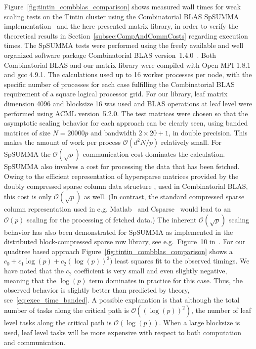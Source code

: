 \documentclass{elsarticle}
\begin{document}
Figure~\ref{fig:tintin_combblas_comparison} shows measured wall times
for weak scaling tests on the Tintin cluster using the Combinatorial
BLAS SpSUMMA implementation~\cite{CombBLAS} and the here presented
matrix library, in order to verify the theoretical results in
Section~\ref{subsec:CompAndCommCosts} regarding execution times.  The
SpSUMMA tests were performed using the freely available and well
organized software package Combinatorial BLAS
version~1.4.0~\cite{CombBLAS}.  Both Combinatorial BLAS and our matrix
library were compiled with Open MPI 1.8.1 and gcc 4.9.1.
The calculations used up to 16 worker processes per node, with the
specific number of processes for each case fulfilling the
Combinatorial BLAS requirement of a square logical processor grid. For
our library, leaf matrix dimension 4096 and blocksize 16 was used and
BLAS operations at leaf level were performed using ACML version~5.2.0.
The test matrices were chosen so that the asymptotic scaling behavior
for each approach can be clearly seen, using banded matrices of size
$N = 20000p$ and bandwidth $2\times 20+1$, in double precision.
This makes the amount of work per process
$\mathcal{O}(d^2N/p)$ relatively small.
For SpSUMMA the $\mathcal{O}(\sqrt{p})$ communication cost dominates
the calculation. SpSUMMA also involves a cost for processing the data
that has been fetched. Owing to the efficient representation of
hypersparse matrices provided by the doubly compressed sparse column
data structure \cite{dcsc2008}, used in Combinatorial BLAS, this cost
is only $\mathcal{O}(\sqrt{p})$ as well. (In contrast, the standard
compressed sparse column representation used in
e.g. Matlab~\cite{matlab_csc1992} and Csparse~\cite{csparse2006} would
lead to an $\mathcal{O}(p)$ scaling for the processing of fetched
data.)  The inherent $\mathcal{O}(\sqrt{p})$ scaling behavior has also been
demonstrated for SpSUMMA as implemented in the distributed
block-compressed sparse row library, see e.g.~Figure~10
in~\cite{Borstnik2014}.
For our quadtree based approach
Figure~\ref{fig:tintin_combblas_comparison} shows a $c_0 + c_1 \log(p)
+ c_2 (\log(p))^2)$ least squares fit to the observed timings. We have
noted that the $c_2$ coefficient is very small and even slightly
negative, meaning that the $\log(p)$ term dominates in practice for
this case. Thus, the observed behavior is slightly better than
predicted by theory, see~\eqref{eq:exec_time_banded}. A possible
explanation is that although the total number of tasks along the
critical path is $\mathcal{O}((\log(p))^2)$, the number of leaf level
tasks along the critical path is $\mathcal{O}(\log(p))$. When a large
blocksize is used, leaf level tasks will be more expensive with
respect to both computation and communication.
\end{document}
